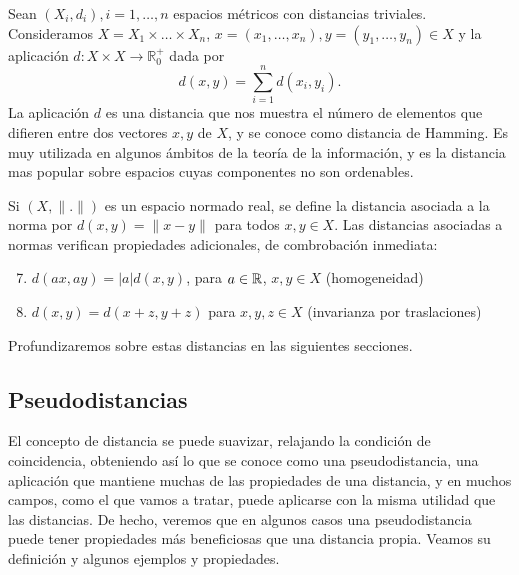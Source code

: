 \begin{example}
    Sean $(X_i,d_i), i=1,\dots, n$ espacios métricos con distancias triviales. Consideramos $X = X_1 \times \dots \times X_n$, $x = (x_1,\dots,x_n), y = (y_1,\dots,y_n) \in X$ y la aplicación $d:X\times X \to \mathbb{R}^+_0$ dada por
    \[d(x,y) = \sum_{i=1}^n d(x_i,y_i).\]
    La aplicación $d$ es una distancia que nos muestra el número de elementos que difieren entre dos vectores $x,y$ de $X$, y se conoce como distancia de Hamming. Es muy utilizada en algunos ámbitos de la teoría de la información, y es la distancia mas popular sobre espacios cuyas componentes no son ordenables.
\end{example}

\begin{example} \label{ex:dist:norm}
    Si $(X,\|.\|)$ es un espacio normado real, se define la distancia asociada a la norma por $d(x,y)=\|x-y\|$ para todos $x,y\in X$. Las distancias asociadas a normas verifican propiedades adicionales, de combrobación inmediata:
    \begin{enumerate}
        \setcounter{enumi}{6}
        \item $d(ax,ay) = |a|d(x,y)$, para $a \in \mathbb{R}$, $x,y \in X$ (homogeneidad) \label{item:dist:homogen}
        \item $d(x,y) = d(x+z,y+z)$ para $x,y,z \in X$ (invarianza por traslaciones) \label{item:dist:inv_tras}
    \end{enumerate}
    Profundizaremos sobre estas distancias en las siguientes secciones.
\end{example}

\subsection{Pseudodistancias}

El concepto de distancia se puede suavizar, relajando la condición de coincidencia, obteniendo así lo que se conoce como una pseudodistancia, una aplicación que mantiene muchas de las propiedades de una distancia, y en muchos campos, como el que vamos a tratar, puede aplicarse con la misma utilidad que las distancias. De hecho, veremos que en algunos casos una pseudodistancia puede tener propiedades más beneficiosas que una distancia propia. Veamos su definición y algunos ejemplos y propiedades.

